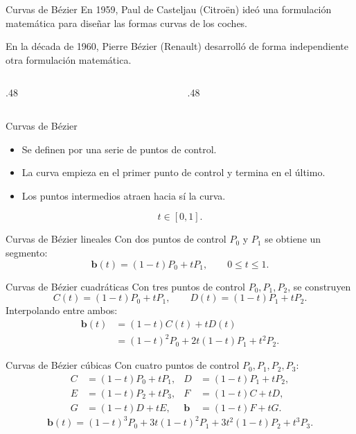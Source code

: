 \documentclass[original_version/main.tex]{subfiles}
\begin{document}
\begin{frame}[t]{Curvas de Bézier}
En 1959, Paul de Casteljau (Citroën) ideó una formulación matemática para diseñar las formas curvas de los coches.\par\medskip En la década de 1960, Pierre Bézier (Renault) desarrolló de forma independiente otra formulación matemática.\begin{columns}[T]\begin{column}{.48\textwidth}\end{column}\begin{column}{.48\textwidth}\end{column}\end{columns}
\end{frame}

\begin{frame}[t]{Curvas de Bézier}
\begin{itemize}
\item Se definen por una serie de puntos de control.
\item La curva empieza en el primer punto de control y termina en el último.
\item Los puntos intermedios atraen hacia sí la curva.
\end{itemize}\[t\in[0,1].\]
\end{frame}

\begin{frame}[t]{Curvas de Bézier lineales}
Con dos puntos de control $P_0$ y $P_1$ se obtiene un segmento:\[\mathbf b(t)=(1-t)P_0+tP_1,\qquad 0\leq t\leq1.\]
\end{frame}

\begin{frame}[t]{Curvas de Bézier cuadráticas}
Con tres puntos de control $P_0,P_1,P_2$, se construyen\[C(t)=(1-t)P_0+tP_1,\qquad D(t)=(1-t)P_1+tP_2.\]Interpolando entre ambos:\[\begin{aligned}\mathbf b(t)&=(1-t)C(t)+tD(t)\\&=(1-t)^2P_0+2t(1-t)P_1+t^2P_2.\end{aligned}\]
\end{frame}

\begin{frame}[t]{Curvas de Bézier cúbicas}
\small Con cuatro puntos de control $P_0,P_1,P_2,P_3$:\[\begin{aligned}C&=(1-t)P_0+tP_1, &D&=(1-t)P_1+tP_2,\\ E&=(1-t)P_2+tP_3, &F&=(1-t)C+tD,\\ G&=(1-t)D+tE, &\mathbf b&=(1-t)F+tG.\end{aligned}\]\[\mathbf b(t)=(1-t)^3P_0+3t(1-t)^2P_1+3t^2(1-t)P_2+t^3P_3.\]
\end{frame}
\end{document}
